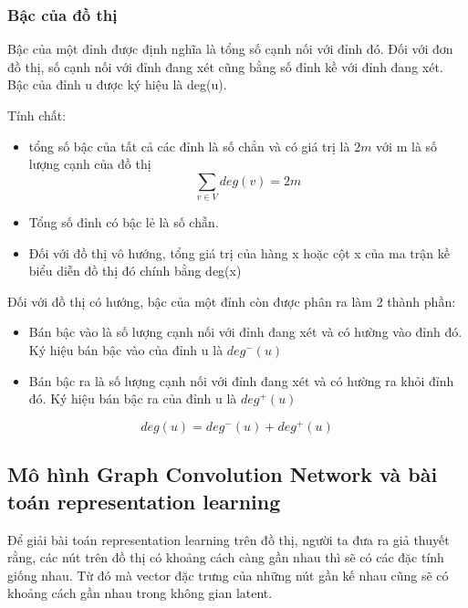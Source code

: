 \subsubsection{Bậc của đồ thị}

Bậc của một đỉnh được định nghĩa là tổng số cạnh nối với đỉnh đó. Đối với đơn đồ thị, số cạnh nối với đỉnh đang xét cũng bằng số đỉnh kề với đỉnh đang xét. Bậc của đỉnh u được ký hiệu là deg(u).

Tính chất:
\begin{itemize}
	\item tổng số bậc của tất cả các đỉnh là số chẳn và có giá trị là $2m$ với m là số lượng cạnh của đồ thị
	\begin{equation*}
		\sum_{v \in V}{deg(v)} = 2m
	\end{equation*}
	\item Tổng số đỉnh có bậc lẻ là số chẵn.
	\item Đối với đồ thị vô hướng, tổng giá trị của hàng x hoặc cột x của ma trận kề biểu diễn đồ thị đó chính bằng deg(x)
\end{itemize}

Đối với đồ thị có hướng, bậc của một đỉnh còn được phân ra làm 2 thành phần:
\begin{itemize}
	\item Bán bậc vào là số lượng cạnh nối với đỉnh đang xét và có hường vào đỉnh đó. Ký hiệu bán bậc vào của đỉnh u là $deg^-(u)$
	\item Bán bậc ra là số lượng cạnh nối với đỉnh đang xét và có hường ra khỏi đỉnh đó. Ký hiệu bán bậc ra của đỉnh u là $deg^+(u)$
\end{itemize}

\begin{equation*}
	deg(u) = deg^-(u) + deg^+(u)
\end{equation*}

\subsection{Mô hình Graph Convolution Network và bài toán representation learning}

Để giải bài toán representation learning trên đồ thị, người ta đưa ra giả thuyết rằng, các nút trên đồ thị có khoảng cách càng gần nhau thì sẽ có các đặc tính giống nhau. Từ đó mà vector đặc trưng của những nút gần kế nhau cũng sẽ có khoảng cách gần nhau trong không gian latent.

